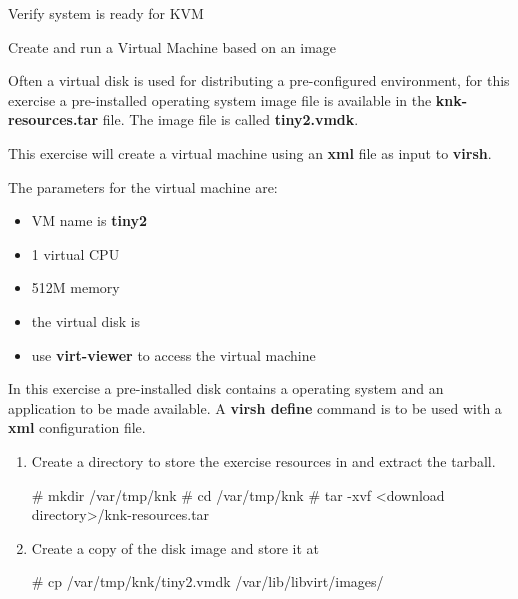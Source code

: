 \begin{Lab}
\begin{exe} {Verify system is ready for KVM }
\begin{sol}
\begin{enumerate}
      \end{enumerate}

   \end{sol}

\end{exe}

\begin{exe} {Create and run a Virtual Machine based on an image}

	Often a virtual disk is used for distributing a 
	pre-configured environment, for this exercise a pre-installed
	operating system image file is available in the
	\textbf{knk-resources.tar} file.
	The image file is called \textbf{tiny2.vmdk}.


	This exercise will create a virtual machine 
	using an \textbf{xml} file as input to \textbf{virsh}.

	The parameters for the virtual machine are:
	\begin{itemize}
		\item VM name is \textbf{tiny2}
		\item 1 virtual CPU
		\item 512M memory
		\item the virtual disk is 
		\item use \textbf{virt-viewer} to access the virtual machine
	\end{itemize}

	In this exercise a pre-installed disk  contains a 
	operating system and an application to be made available. 
	A \textbf{virsh define} command is 
	to be used with a \textbf{xml} configuration file. 

		
	\begin{sol}
	
		\begin{enumerate}
		\item Create a directory to store the exercise 
			resources in and extract the tarball.
			\begin{raw}
# mkdir  /var/tmp/knk 
# cd /var/tmp/knk
# tar -xvf <download directory>/knk-resources.tar
			\end{raw}

		\item Create a copy of the disk image 
			and store it at 
			\begin{raw} 
# cp /var/tmp/knk/tiny2.vmdk  /var/lib/libvirt/images/ 
			\end{raw}


\end{enumerate}
\end{sol}
\end{exe}
\end{Lab}
